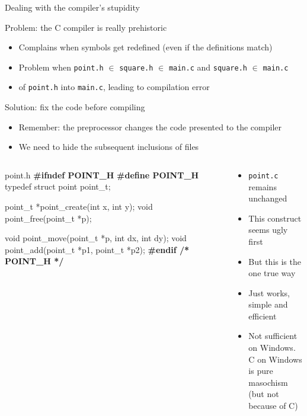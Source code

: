 \begin{frame}[fragile]{Dealing with the compiler's stupidity}
  \begin{block}{Problem: the C compiler is really prehistoric}
    \begin{itemize}
    \item Complains when symbols get redefined (even if the
      definitions match)
    \item Problem when \texttt{point.h} $\in$ \texttt{square.h} $\in$
      \texttt{main.c} and \texttt{square.h} $\in$ \texttt{main.c}
    \item {} of \texttt{point.h} into
      \texttt{main.c}, leading to compilation error
    \end{itemize}
  \end{block}

  \begin{block}{Solution: fix the code before compiling}
    \begin{itemize}
    \item Remember: the preprocessor changes the code presented to the compiler
    \item We need to hide the subsequent inclusions of files
    \end{itemize}
  \end{block}

  \begin{columns}
    \begin{column}{.47\linewidth}
      \begin{boitecode}{point.h}
\alert{\textbf{\#ifndef POINT\_H}}
\alert{\textbf{\#define POINT\_H}}
typedef struct point point_t;              

point_t *point_create(int x, int y);
void point_free(point_t *p);

void point_move(point_t *p, int dx, int dy);      
void point_add(point_t *p1, point_t *p2);      
\alert{\textbf{\#endif /* POINT\_H */}}
      \end{boitecode}
    \end{column}

    \begin{column}{.48\linewidth}
      \begin{itemize}\vspace{-.6\baselineskip}
      \item \texttt{point.c} remains unchanged
      \item This construct seems ugly first
      \item But this is the one true way
      \item Just works, simple and efficient
      \item Not sufficient on Windows.\\
        C on Windows is pure masochism\\
        (but not because of C)
      \end{itemize}
    \end{column}
  \end{columns}
\end{frame}
